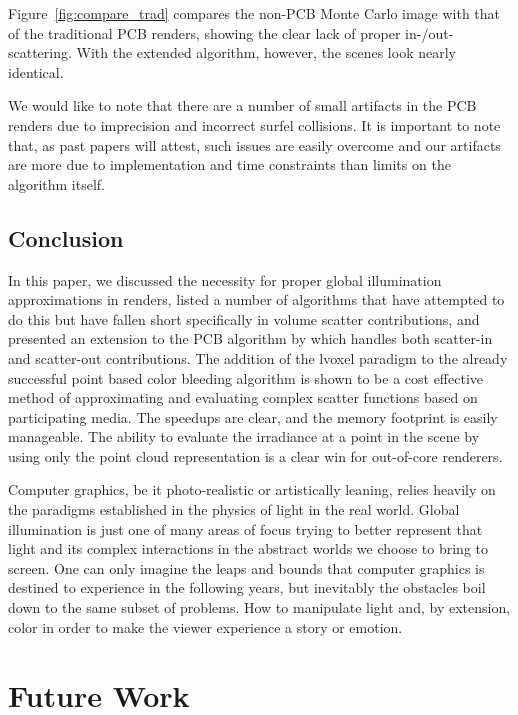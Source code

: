 \documentclass[12pt]{ucthesis}
\begin{document}
Figure~\ref{fig:compare_trad} compares the non-PCB Monte Carlo image with that of the traditional PCB renders, showing the clear lack of proper in-/out-scattering.  With the extended algorithm, however, the scenes look nearly identical.

We would like to note that there are a number of small artifacts in the PCB renders due to imprecision and incorrect surfel collisions.  It is important to note that, as past papers will attest, such issues are easily overcome and our artifacts are more due to implementation and time constraints than limits on the algorithm itself.

\section{Conclusion}

In this paper, we discussed the necessity for proper global illumination approximations in renders, listed a number of algorithms that have attempted to do this but have fallen short specifically in volume scatter contributions, and presented an extension to the PCB algorithm by \cite{christensen:2008} which handles both scatter-in and scatter-out contributions.  The addition of the lvoxel paradigm to the already successful point based color bleeding algorithm is shown to be a cost effective method of approximating and evaluating complex scatter functions based on participating media.  The speedups are clear, and the memory footprint is easily manageable.  The ability to evaluate the irradiance at a point in the scene by using only the point cloud representation is a clear win for out-of-core renderers.

Computer graphics, be it photo-realistic or artistically leaning, relies heavily on the paradigms established in the physics of light in the real world.  Global illumination is just one of many areas of focus trying to better represent that light and its complex interactions in the abstract worlds we choose to bring to screen.  One can only imagine the leaps and bounds that computer graphics is destined to experience in the following years, but inevitably the obstacles boil down to the same subset of problems.  How to manipulate light and, by extension, color in order to make the viewer experience a story or emotion.

\chapter{Future Work}
\end{document}
